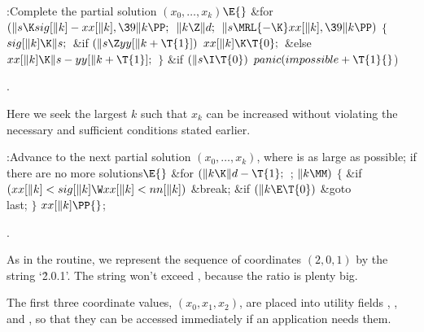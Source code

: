 \B{}:Complete the partial solution $(x_0,\ldots,x_k)$\X${}\E{}$\6
\&{for} ${}(\|s\K\\{sig}[\|k]-\\{xx}[\|k],\39\|k\PP;{}$ ${}\|k\Z\|d;{}$ ${}\|s%
\MRL{-{\K}}\\{xx}[\|k],\39\|k\PP){}$\5
${}\{{}$\1\6
${}\\{sig}[\|k]\K\|s;{}$\6
\&{if} ${}(\|s\Z\\{yy}[\|k+\T{1}]){}$\1\5
${}\\{xx}[\|k]\K\T{0};{}$\2\6
\&{else}\1\5
${}\\{xx}[\|k]\K\|s-\\{yy}[\|k+\T{1}];{}$\2\6
\4${}\}{}$\2\6
\&{if} ${}(\|s\I\T{0})$ $\\{panic}(\\{impossible}+\T{1}{}$)%
\par
{}.\fi

Here we seek the largest $k$ such that $x_k$ can be increased without
violating the necessary and sufficient conditions stated earlier.

\Y\B\4:Advance to the next partial solution $(x_0,\ldots,x_k)$, where  is as large as possible;  if there are no more
solutions\X${}\E{}$\6
\&{for} ${}(\|k\K\|d-\T{1};{}$  ; ${}\|k\MM){}$\5
${}\{{}$\1\6
\&{if} ${}(\\{xx}[\|k]<\\{sig}[\|k]\W\\{xx}[\|k]<\\{nn}[\|k]){}$\1\5
\&{break};\2\6
\&{if} ${}(\|k\E\T{0}){}$\1\5
\&{goto} \\{last};\2\6
\4${}\}{}$\2\6
${}\\{xx}[\|k]\PP{}$;\par
{}.\fi

As in the  routine, we represent the sequence of
coordinates
$(2,0,1)$ by the string `\.{2.0.1}'.
The string won't exceed , because the ratio  is
plenty big.

The first three coordinate values, $(x_0,x_1,x_2)$, are placed into
utility fields , , and , so that they can be accessed
immediately
if an application needs them.

